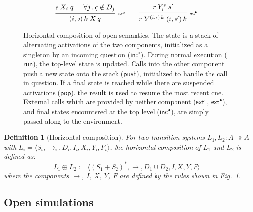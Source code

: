 \documentclass[draft,11pt]{report}
\newtheorem{definition}{Definition}
\newcommand{\kw}[1]{\ensuremath{ \mathsf{#1} }}
\newcommand{\que}{\circ}         %
\newcommand{\ans}{\bullet}       %
\begin{document}
\begin{figure}
\begin{minipage}{0.66\textwidth}
\[\begin{array}{c}
      \\[1ex]
     {\begin{prooftree}
        \hypo{s \mathrel{X_i} q}
        \hypo{\forall j \,.\, q \notin D_j}
        \infer2[\tiny $\kw{ext}^\que$]{(i, s) \, k \mathrel{X} q}
      \end{prooftree}}
      \qquad
     {\begin{prooftree}
        \hypo{r \mathrel{Y_i^s} s'}
        \infer1[\tiny $\kw{ext}^\ans$]{
          r \mathrel{Y^{(i, s) \, k}} (i, s') \, k}
      \end{prooftree}}
    \end{array}
  \]
  \end{minipage}
    \caption{Horizontal composition of open semantics.
      The state is a stack of alternating activations
      of the two components,
      initialized as a singleton by an incoming question ($\kw{inc}^\que$).
      During normal execution ($\kw{run}$),
      the top-level state is updated.
      Calls into the other component
      push a new state onto the stack ($\kw{push}$),
      initialized to handle the call in question.
      If a final state is reached
      while there are suspended activations ($\kw{pop}$),
      the result is used to resume the most recent one.
      External calls which are provided by neither component
      ($\kw{ext}^\que$, $\kw{ext}^\ans$),
      and final states encountered at the top level
      ($\kw{inc}^\ans$),
      are simply passed along to the environment.
    }
    \label{fig:hcomp}
\end{figure}

\begin{definition}[Horizontal composition] \label{def:hcomp} %
For two transition systems $L_1, L_2 : A \twoheadrightarrow A$
with
$L_i = \langle S_i, {\rightarrow}_i, D_i, I_i, X_i, Y_i, F_i \rangle$,
the \emph{horizontal composition} of $L_1$ and $L_2$
is defined as:
\[
    L_1 \oplus L_2 :=
    \langle
      (S_1 + S_2)^*, {\rightarrow}, D_1 \cup D_2, I, X, Y, F
    \rangle
\]
where the components $\rightarrow$, $I$, $X$, $Y$, $F$
are defined by
the rules shown in Fig.~\ref{fig:hcomp}.
\end{definition}



\subsection{Open simulations} \label{sec:sem:ref} %
\end{document}
